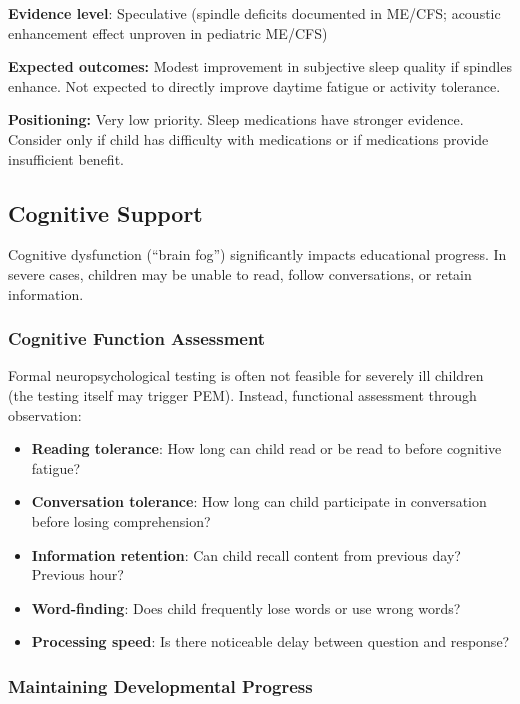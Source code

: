 \begin{recommendation}
\textbf{Evidence level}: Speculative (spindle deficits documented in ME/CFS; acoustic enhancement effect unproven in pediatric ME/CFS)

\textbf{Expected outcomes:} Modest improvement in subjective sleep quality if spindles enhance. Not expected to directly improve daytime fatigue or activity tolerance.

\textbf{Positioning:} Very low priority. Sleep medications have stronger evidence. Consider only if child has difficulty with medications or if medications provide insufficient benefit.

\end{recommendation}

\subsection{Cognitive Support}
\label{subsec:ped-severe-cognitive}

Cognitive dysfunction (``brain fog'') significantly impacts educational progress. In severe cases, children may be unable to read, follow conversations, or retain information.

\subsubsection{Cognitive Function Assessment}

Formal neuropsychological testing is often not feasible for severely ill children (the testing itself may trigger PEM). Instead, functional assessment through observation:

\begin{itemize}
    \item \textbf{Reading tolerance}: How long can child read or be read to before cognitive fatigue?
    \item \textbf{Conversation tolerance}: How long can child participate in conversation before losing comprehension?
    \item \textbf{Information retention}: Can child recall content from previous day? Previous hour?
    \item \textbf{Word-finding}: Does child frequently lose words or use wrong words?
    \item \textbf{Processing speed}: Is there noticeable delay between question and response?
\end{itemize}

\subsubsection{Maintaining Developmental Progress}

